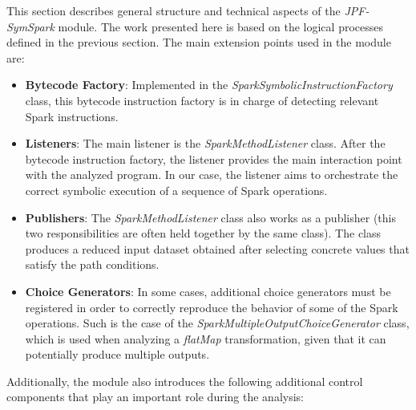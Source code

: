\label{sec:module}


This section describes general structure and technical aspects of the \textit{JPF-SymSpark} module. The work presented here is based on the logical processes defined in the previous section. The main extension points used in the module are:

\begin{itemize}
	\item \textbf{Bytecode Factory}: Implemented in the \textit{SparkSymbolicInstructionFactory} class, this bytecode instruction factory is in charge of detecting relevant Spark instructions.
	\item \textbf{Listeners}: The main listener is the \textit{SparkMethodListener} class. After the bytecode instruction factory, the listener provides the main interaction point with the analyzed program. In our case, the listener aims to orchestrate the correct symbolic execution of a sequence of Spark operations.
	\item \textbf{Publishers}: The \textit{SparkMethodListener} class also works as a publisher (this two responsibilities are often held together by the same class). The class produces a reduced input dataset obtained after selecting concrete values that satisfy the path conditions.
	\item \textbf{Choice Generators}: In some cases, additional choice generators must be registered in order to correctly reproduce the behavior of some of the Spark operations. Such is the case of the \textit{SparkMultipleOutputChoiceGenerator} class, which is used when analyzing a \textit{flatMap} transformation, given that it can potentially produce multiple outputs.
\end{itemize}

Additionally, the module also introduces the following additional control components that play an important role during the analysis:

